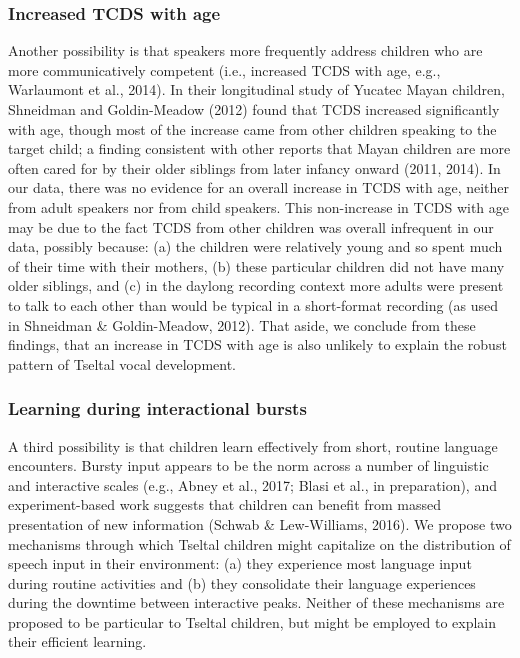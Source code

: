 \documentclass[floatsintext,man]{apa6}
\theoremstyle{definition}
\theoremstyle{definition}
\theoremstyle{definition}
\theoremstyle{remark}
\begin{document}
\subsubsection{Increased TCDS with age}\label{increased-tcds-with-age}

Another possibility is that speakers more frequently address children
who are more communicatively competent (i.e., increased TCDS with age,
e.g., Warlaumont et al., 2014). In their longitudinal study of Yucatec
Mayan children, Shneidman and Goldin-Meadow (2012) found that TCDS
increased significantly with age, though most of the increase came from
other children speaking to the target child; a finding consistent with
other reports that Mayan children are more often cared for by their
older siblings from later infancy onward (2011, 2014). In our data,
there was no evidence for an overall increase in TCDS with age, neither
from adult speakers nor from child speakers. This non-increase in TCDS
with age may be due to the fact TCDS from other children was overall
infrequent in our data, possibly because: (a) the children were
relatively young and so spent much of their time with their mothers, (b)
these particular children did not have many older siblings, and (c) in
the daylong recording context more adults were present to talk to each
other than would be typical in a short-format recording (as used in
Shneidman \& Goldin-Meadow, 2012). That aside, we conclude from these
findings, that an increase in TCDS with age is also unlikely to explain
the robust pattern of Tseltal vocal development.

\subsubsection{Learning during interactional
bursts}\label{learning-during-interactional-bursts}

A third possibility is that children learn effectively from short,
routine language encounters. Bursty input appears to be the norm across
a number of linguistic and interactive scales (e.g., Abney et al., 2017;
Blasi et al., in preparation), and experiment-based work suggests that
children can benefit from massed presentation of new information (Schwab
\& Lew-Williams, 2016). We propose two mechanisms through which Tseltal
children might capitalize on the distribution of speech input in their
environment: (a) they experience most language input during routine
activities and (b) they consolidate their language experiences during
the downtime between interactive peaks. Neither of these mechanisms are
proposed to be particular to Tseltal children, but might be employed to
explain their efficient learning.
\end{document}
